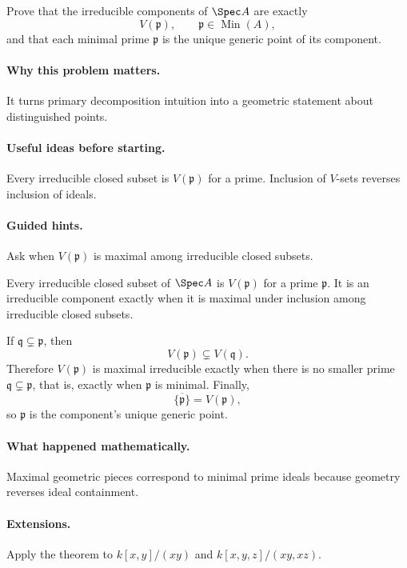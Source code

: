 \begin{problem}
Prove that the irreducible components of $\Spec A$ are exactly
\[
V(\mathfrak p),\qquad \mathfrak p\in\operatorname{Min}(A),
\]
and that each minimal prime $\mathfrak p$ is the unique generic point of its component.
\end{problem}

\paragraph{Why this problem matters.}
It turns primary decomposition intuition into a geometric statement about distinguished
points.

\paragraph{Useful ideas before starting.}
Every irreducible closed subset is $V(\mathfrak p)$ for a prime.  Inclusion of $V$-sets
reverses inclusion of ideals.

\paragraph{Guided hints.}
Ask when $V(\mathfrak p)$ is maximal among irreducible closed subsets.

\begin{solution}
Every irreducible closed subset of $\Spec A$ is $V(\mathfrak p)$ for a prime
$\mathfrak p$.  It is an irreducible component exactly when it is maximal under inclusion
among irreducible closed subsets.

If $\mathfrak q\subsetneq\mathfrak p$, then
\[
V(\mathfrak p)\subsetneq V(\mathfrak q).
\]
Therefore $V(\mathfrak p)$ is maximal irreducible exactly when there is no smaller prime
$\mathfrak q\subsetneq\mathfrak p$, that is, exactly when $\mathfrak p$ is minimal.
Finally,
\[
\overline{\{\mathfrak p\}}=V(\mathfrak p),
\]
so $\mathfrak p$ is the component's unique generic point.
\end{solution}

\paragraph{What happened mathematically.}
Maximal geometric pieces correspond to minimal prime ideals because geometry reverses ideal
containment.

\paragraph{Extensions.}
Apply the theorem to $k[x,y]/(xy)$ and $k[x,y,z]/(xy,xz)$.
